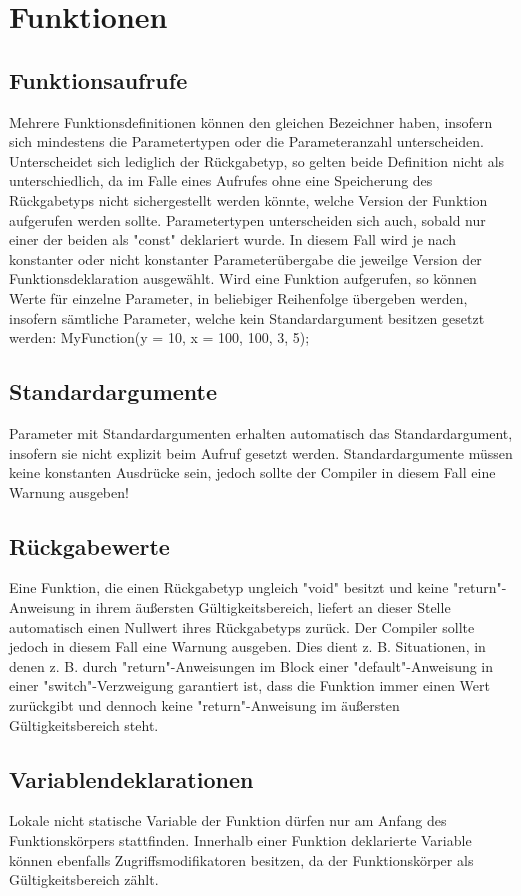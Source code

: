 \chapter{Funktionen}

\section{Funktionsaufrufe}
Mehrere Funktionsdefinitionen können den gleichen Bezeichner haben, insofern sich mindestens die Parametertypen oder die Parameteranzahl unterscheiden.
Unterscheidet sich lediglich der Rückgabetyp, so gelten beide Definition nicht als unterschiedlich, da im Falle eines Aufrufes ohne eine Speicherung
des Rückgabetyps nicht sichergestellt werden könnte, welche Version der Funktion aufgerufen werden sollte.
Parametertypen unterscheiden sich auch, sobald nur einer der beiden als "const" deklariert wurde. In diesem Fall wird je nach konstanter oder nicht
konstanter Parameterübergabe die jeweilge Version der Funktionsdeklaration ausgewählt.
Wird eine Funktion aufgerufen, so können Werte für einzelne Parameter, in beliebiger Reihenfolge übergeben werden, insofern sämtliche
Parameter, welche kein Standardargument besitzen gesetzt werden:
MyFunction(y = 10, x = 100, 100, 3, 5);

\section{Standardargumente}
Parameter mit Standardargumenten erhalten automatisch das Standardargument, insofern sie nicht explizit beim Aufruf gesetzt werden.
Standardargumente müssen keine konstanten Ausdrücke sein, jedoch sollte der Compiler in diesem Fall eine Warnung ausgeben!

\section{Rückgabewerte}
Eine Funktion, die einen Rückgabetyp ungleich "void" besitzt und keine "return"-Anweisung in ihrem äußersten Gültigkeitsbereich, liefert an dieser Stelle
automatisch einen Nullwert ihres Rückgabetyps zurück. Der Compiler sollte jedoch in diesem Fall eine Warnung ausgeben.
Dies dient z. B. Situationen, in denen z. B. durch "return"-Anweisungen im Block einer "default"-Anweisung in einer "switch"-Verzweigung
garantiert ist, dass die Funktion immer einen Wert zurückgibt und dennoch keine "return"-Anweisung im äußersten Gültigkeitsbereich steht.

\section{Variablendeklarationen}
Lokale nicht statische Variable der Funktion dürfen nur am Anfang des Funktionskörpers stattfinden. Innerhalb einer Funktion deklarierte
Variable können ebenfalls Zugriffsmodifikatoren besitzen, da der Funktionskörper als Gültigkeitsbereich zählt.

